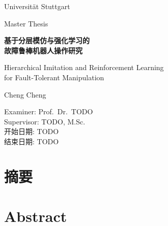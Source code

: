 \documentclass[
  12pt,
  a4paper,
  twoside,
  openright,
]{ctexbook}
\begin{document}
\begin{titlepage}
\centering
\vspace*{2cm}
{\Large Universität Stuttgart \par}
\vspace{0.5cm}
{\large Master Thesis \par}
\vspace{2cm}
{\LARGE\bfseries 基于分层模仿与强化学习的\\[0.3em]故障鲁棒机器人操作研究\par}
\vspace{1cm}
{\Large Hierarchical Imitation and Reinforcement Learning\\[0.3em]
for Fault-Tolerant Manipulation\par}
\vspace{2cm}
{\large  \quad Cheng Cheng\par}
\vspace{1cm}
{\normalsize
  Examiner: Prof.\ Dr.\ TODO \\
  Supervisor: TODO, M.Sc. \\[1em]
  开始日期: TODO \\
  结束日期: TODO \\
}
\vfill
{\small \the\year \par}
\end{titlepage}

\frontmatter

\chapter*{摘\quad 要}


\chapter*{Abstract}


\tableofcontents
\listoffigures
\listoftables

\mainmatter









\printbibliography[heading=bibintoc, title={参考文献}]

% 
\end{document}
